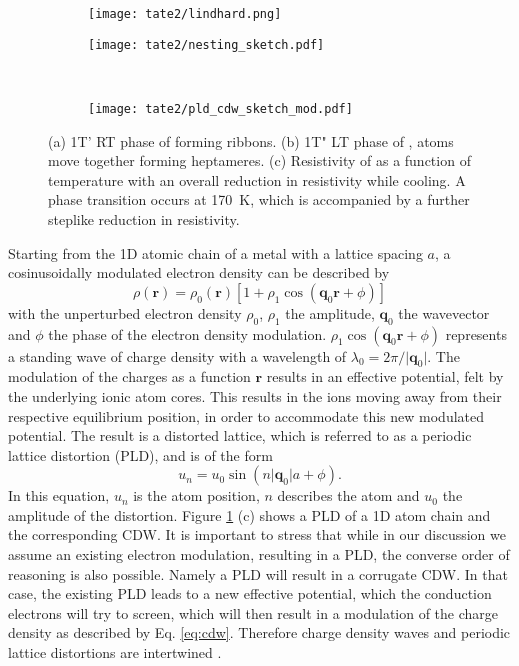 \begin{figure}[t]
	\centering
	\begin{subfigure}[b]{0.45\textwidth}
		\texttt{[image: tate2/lindhard.png]}
	\end{subfigure}
	\hfill
	\begin{subfigure}[b]{0.5\textwidth}
		\texttt{[image: tate2/nesting\_sketch.pdf]}
	\end{subfigure}
	\\
	\begin{subfigure}[b]{0.9\textwidth}
		\texttt{[image: tate2/pld\_cdw\_sketch\_mod.pdf]}
	\end{subfigure}
	\caption{(a) 1T' RT phase of  forming ribbons. (b) 1T" LT phase of ,  atoms move together forming heptameres. (c) Resistivity of  as a function of temperature with an overall reduction in resistivity while cooling. A phase transition occurs at \qty{170}{\kelvin}, which is accompanied by a further steplike reduction in resistivity.}
	\label{fig:cdw_theory}
\end{figure}

Starting from the 1D atomic chain of a metal with a lattice spacing $a$, a cosinusoidally modulated electron density can be described by
\begin{equation}
	\rho(\mathbf{r}) = \rho_0(\mathbf{r})[1+\rho_1 \cos(\mathbf{q}_0\mathbf{r}+\phi)]
	\label{eq:cdw}
\end{equation}
with the unperturbed electron density $\rho_0$, $\rho_1$ the amplitude, $\mathbf{q}_0$ the wavevector and $\phi$ the phase of the electron density modulation.
$\rho_1 \cos(\mathbf{q}_0\mathbf{r}+\phi)$ represents a standing wave of charge density with a wavelength of $\lambda_0 = 2\pi/\lvert \mathbf{q}_0\rvert$.
The modulation of the charges as a function $\mathbf{r}$ results in an effective potential, felt by the underlying ionic atom cores.
This results in the ions moving away from their respective equilibrium position, in order to accommodate this new modulated potential.
The result is a distorted lattice, which is referred to as a periodic lattice distortion (PLD), and is of the form
\begin{equation}
	u_n = u_0 \sin(n\lvert \mathbf{q}_0\rvert a+\phi).
	\label{eq:pld}
\end{equation}
In this equation, $u_n$ is the atom position, $n$ describes the atom and $u_0$ the amplitude of the distortion.
Figure \ref{fig:cdw_theory} (c) shows a PLD of a 1D atom chain and the corresponding CDW.
It is important to stress that while in our discussion we assume an existing electron modulation, resulting in a PLD, the converse order of reasoning is also possible. Namely a PLD will result in a corrugate CDW.
In that case, the existing PLD leads to a new effective potential, which the conduction electrons will try to screen, which will then result in a modulation of the charge density as described by Eq. \ref{eq:cdw}.
Therefore charge density waves and periodic lattice distortions are intertwined \cite{rossnagel_origin_2011, chan_spin_1973, johannes_fermi_2008}.

